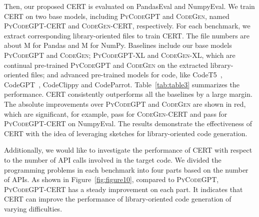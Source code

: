 \documentclass{article}
\newcommand{\cert}{\textsc{CERT}\xspace}
\newcommand{\peval}{PandasEval\xspace}
\newcommand{\neval}{NumpyEval\xspace}
\newcommand{\codepy}{\textsc{PyCodeGPT}\xspace}
\newcommand{\codepyxl}{\textsc{PyCodeGPT}-XL\xspace}
\newcommand{\codegen}{\textsc{CodeGen}\xspace}
\newcommand{\codegenxl}{\textsc{CodeGen}-XL\xspace}
\newcommand{\pandas}{Pandas\xspace}
\newcommand{\numpy}{NumPy\xspace}
\begin{document}
Then, our proposed \cert is evaluated on \peval and \neval. 
We train CERT on two base models, including \codepy and \codegen, named \codepy-\cert and \codegen-\cert, respectively.
For each benchmark, we extract corresponding library-oriented files to train \cert. The file numbers are about M for \pandas and M for \numpy.
Baselines include our base models \codepy and \codegen; \codepyxl and \codegenxl, which are continual pre-trained \codepy and \codegen on the extracted library-oriented files; and advanced pre-trained models for code, like  CodeT5~\cite{wang2021codet5}, CodeGPT~\cite{lu2021codexglue}, CodeClippy and CodeParrot. Table~\ref{tab:table3} summarizes the performance. \cert consistently outperforms all the baselines by a large margin. The absolute improvements over \codepy and \codegen are shown in red, which are significant, for example,  pass for \codegen-\cert and  pass for \codepy-\cert on \neval. 
The results demonstrate the effectiveness of \cert with the idea of leveraging sketches for library-oriented code generation.

Additionally, we would like to investigate the performance of \cert with respect to the number of API calls involved in the target code. We divided the programming problems in each benchmark into four parts based on the number of APIs. As shown in Figure~\ref{fig:figure10}, compared to \codepy, \codepy-\cert has a steady improvement on each part. It indicates that \cert can improve the performance of library-oriented code generation of varying difficulties.
\end{document}
